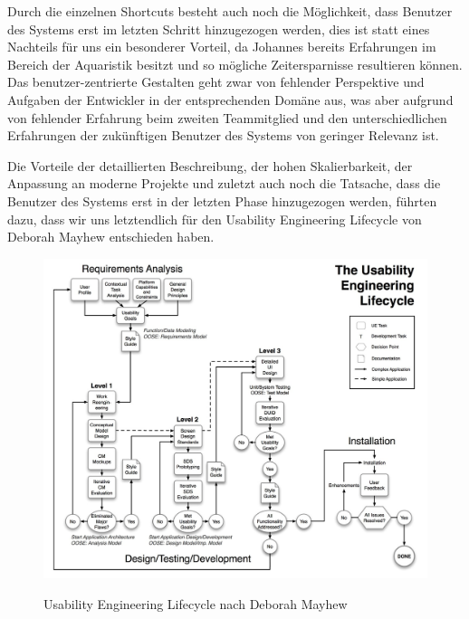 Durch die einzelnen Shortcuts besteht auch noch die Möglichkeit, dass Benutzer des Systems erst im letzten Schritt hinzugezogen werden, dies ist statt eines Nachteils für uns ein besonderer Vorteil, da Johannes bereits Erfahrungen im Bereich der Aquaristik besitzt und so mögliche Zeitersparnisse resultieren können. Das benutzer-zentrierte Gestalten geht zwar von fehlender Perspektive und Aufgaben der Entwickler in der entsprechenden Domäne aus, was aber aufgrund von fehlender Erfahrung beim zweiten Teammitglied und den unterschiedlichen Erfahrungen der zukünftigen Benutzer des Systems von geringer Relevanz ist. 

Die Vorteile der detaillierten Beschreibung, der hohen Skalierbarkeit, der Anpassung an moderne Projekte und zuletzt auch noch die Tatsache, dass die Benutzer des Systems erst in der letzten Phase hinzugezogen werden, führten dazu, dass wir uns letztendlich für den Usability Engineering Lifecycle von Deborah Mayhew entschieden haben.


\begin{figure}
	\centering
	\includegraphics[width=\linewidth,height=\textheight,
keepaspectratio]{ue_cycle}
	\caption{Usability Engineering Lifecycle nach Deborah Mayhew}
	\cite{Picture:UEL}
	\label{ue_cycle}
\end{figure}
